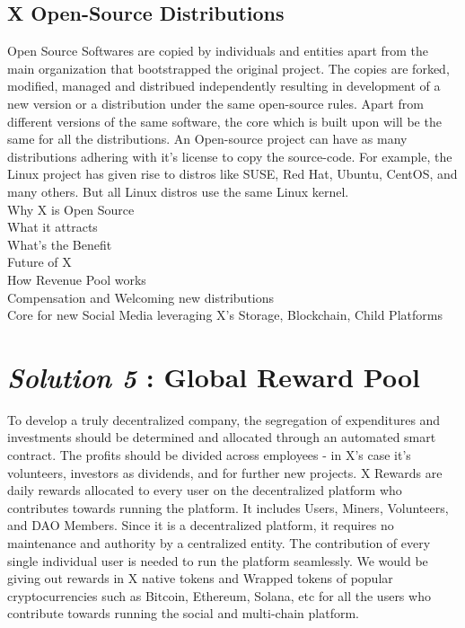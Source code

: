 \documentclass[letterpaper,11pt]{article}
\begin{document}
\subsection{\textbf{X Open-Source Distributions}}
Open Source Softwares are copied by individuals and entities apart from the main organization that bootstrapped the original project. The copies are forked, modified, managed and distribued independently resulting in development of a new version or a distribution under the same open-source rules. Apart from different versions of the same software, the core which is built upon will be the same for all the distributions. An Open-source project can have as many distributions adhering with it's license to copy the source-code. For example, the Linux project has given rise to distros like SUSE, Red Hat, Ubuntu, CentOS, and many others. But all Linux distros use the same Linux kernel.\\
Why X is Open Source\\
What it attracts\\
What's the Benefit\\
Future of X\\
How Revenue Pool works\\
Compensation and Welcoming new distributions\\
Core for new Social Media leveraging X's Storage, Blockchain, Child Platforms\\
\section{\textbf{\textit{Solution 5} : Global Reward Pool}}
To develop a truly decentralized company, the segregation of expenditures and investments should be determined and allocated through an automated smart contract. The profits should be divided across employees - in X's case it's volunteers,  investors as dividends, and for further new projects. X Rewards are daily rewards allocated to every user on the decentralized platform who contributes towards running the platform. It includes Users, Miners, Volunteers, and DAO Members. Since it is a decentralized platform, it requires no maintenance and authority by a centralized entity. The contribution of every single individual user is needed to run the platform seamlessly. We would be giving out rewards in X native tokens and Wrapped tokens of popular cryptocurrencies such as Bitcoin, Ethereum, Solana, etc for all the users who contribute towards running the social and multi-chain platform.\\
\end{document}

